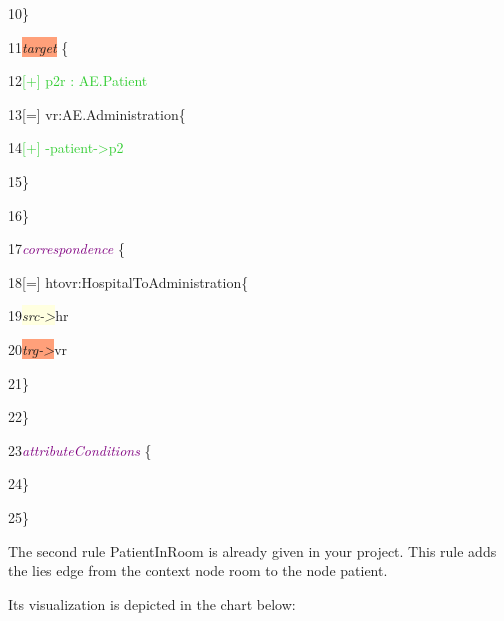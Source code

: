 {{10\hspace{0.5cm}\}

11\hspace{0.5cm}\colorbox{LightSalmon}{\textit{target}} \{

12\hspace{1cm}\textcolor{LimeGreen}{[+] p2r : AE.Patient}

13\hspace{1cm}[=] vr:AE.Administration\{

14\hspace{1.5cm}\textcolor{LimeGreen}{[+] -patient->p2}

15\hspace{1cm}\}

16\hspace{0.5cm}\}

17\hspace{0.5cm}\textcolor{Purple}{\textit{correspondence}} \{
	
18\hspace{1cm}[=] htovr:HospitalToAdministration\{

19\hspace{1.5cm}\colorbox{LightYellow}{\textit{src->}}hr
			
20\hspace{1.5cm}\colorbox{LightSalmon}{\textit{trg->}}vr

21\hspace{1cm}\}

22\hspace{0.5cm}\}

23\hspace{0.5cm}\textcolor{Purple}{\textit{attributeConditions}} \{

24\hspace{0.5cm}\}

25\hspace{0.5cm}\}

}

\clearpage

The second rule \textsf{PatientInRoom} is already given in your project. This rule adds the \textsf{lies} edge from the context node \textsf{room} to the node \textsf{patient}.\newline

Its visualization is depicted in the chart below:

}
